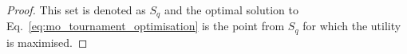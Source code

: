 \documentclass[10pt]{article}
\begin{document}
\begin{proof}
    This set is denoted as $S_q$ and the optimal solution to
    Eq.~\ref{eq:mo_tournament_optimisation} is the point from $S_q$ for which the
    utility is maximised.
\end{proof}
\end{document}
